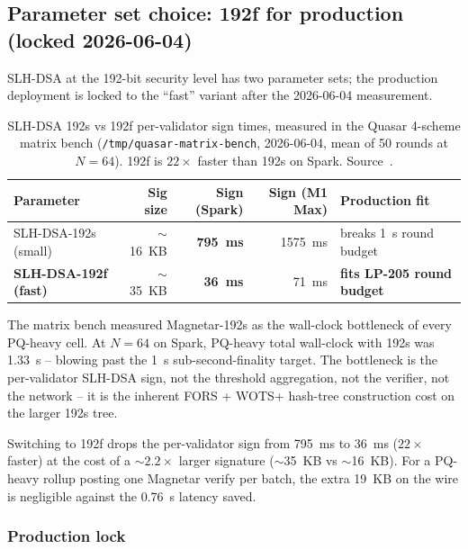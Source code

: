 \subsection{Parameter set choice: 192f for production
(locked 2026-06-04)}
\label{sec:magnetar-192f-lock}

SLH-DSA at the 192-bit security level has two parameter sets;
the production deployment is locked to the ``fast'' variant
after the 2026-06-04 measurement.

\begin{table}[h]
\centering
\small
\begin{tabular}{@{}lrrrl@{}}
\toprule
\textbf{Parameter} & \textbf{Sig size} & \textbf{Sign (Spark)} & \textbf{Sign (M1 Max)} & \textbf{Production fit} \\
\midrule
SLH-DSA-192s (small) & $\sim$\SI{16}{KB} & \textbf{\SI{795}{\milli\second}} & \SI{1575}{\milli\second} & breaks \SI{1}{\second} round budget \\
\textbf{SLH-DSA-192f (fast)} & $\sim$\SI{35}{KB} & \textbf{\SI{36}{\milli\second}} & \SI{71}{\milli\second} & \textbf{fits LP-205 round budget} \\
\bottomrule
\end{tabular}
\caption{SLH-DSA 192s vs 192f per-validator sign times,
measured in the Quasar 4-scheme matrix bench
(\texttt{/tmp/quasar-matrix-bench}, 2026-06-04, mean of 50
rounds at $N{=}64$). 192f is $22\times$ faster than 192s on
Spark. Source~\cite{parityaudit}.}
\label{tab:magnetar-192f-lock}
\end{table}

The matrix bench measured Magnetar-192s as the wall-clock
bottleneck of every PQ-heavy cell. At $N{=}64$ on Spark,
PQ-heavy total wall-clock with 192s was \SI{1.33}{\second} --
blowing past the \SI{1}{\second} sub-second-finality target. The
bottleneck is the per-validator SLH-DSA sign, not the threshold
aggregation, not the verifier, not the network -- it is the
inherent FORS + WOTS+ hash-tree construction cost on the larger
192s tree.

Switching to 192f drops the per-validator sign from
\SI{795}{\milli\second} to \SI{36}{\milli\second}
($22\times$ faster) at the cost of a $\sim$$2.2\times$ larger
signature ($\sim$\SI{35}{KB} vs $\sim$\SI{16}{KB}). For a
PQ-heavy rollup posting one Magnetar verify per batch, the
extra \SI{19}{KB} on the wire is negligible against the
\SI{0.76}{\second} latency saved.

\subsubsection{Production lock}

